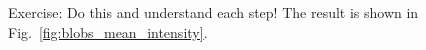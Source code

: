 Exercise: Do this and understand each step!
The result is shown in Fig.~\ref{fig:blobs_mean_intensity}.